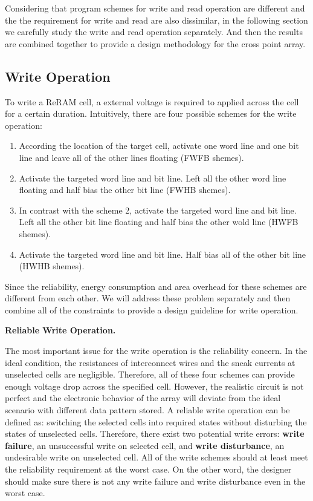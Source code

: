 Considering that program schemes for write and read operation are
different and the the requirement for write and read are also dissimilar,
in the following section we carefully study the write and read operation
separately. And then the results are combined together to provide a design
methodology for the cross point array.

\subsection{Write Operation}
To write a ReRAM cell, a external voltage is required to applied across the cell for a certain duration. Intuitively, there are four possible schemes for the write operation:
\begin{enumerate}
  \item According the location of the target cell, activate one word line and one bit line and leave all of the other lines floating (FWFB shemes).
  \item Activate the targeted word line and bit line. Left all the other word line floating and half bias the other bit line (FWHB shemes).
  \item In contrast with the scheme 2, activate the targeted word line and bit line. Left all the other bit line floating and half bias the other wold line (HWFB shemes).
  \item Activate the targeted word line and bit line. Half bias all of the other bit line (HWHB shemes).
\end{enumerate}
Since the reliability, energy consumption and area overhead for these
schemes are different from each other. We will address these problem
separately and then combine all of the constraints to provide a design
guideline for write operation.

\vspace{10pt} \textbf{Reliable Write Operation.} \vspace{8pt}

The most important issue for the write operation is the reliability
concern. In the ideal condition, the resistances of interconnect wires and
the sneak currents at unselected cells are negligible. Therefore, all of
these four schemes can provide enough voltage drop across the specified
cell. However, the realistic circuit is not perfect and the electronic
behavior of the array will deviate from the ideal scenario with different
data pattern stored. A reliable write operation can be defined as:
switching the selected cells into required states without disturbing the
states of unselected cells. Therefore, there exist two potential write
errors: \textbf{write failure}, an unsuccessful write on selected cell,
and \textbf{write disturbance}, an undesirable write on unselected cell.
All of the write schemes should at least meet the reliability requirement
at the worst case. On the other word, the designer should make sure there
is not any write failure and write disturbance even in the worst case.

